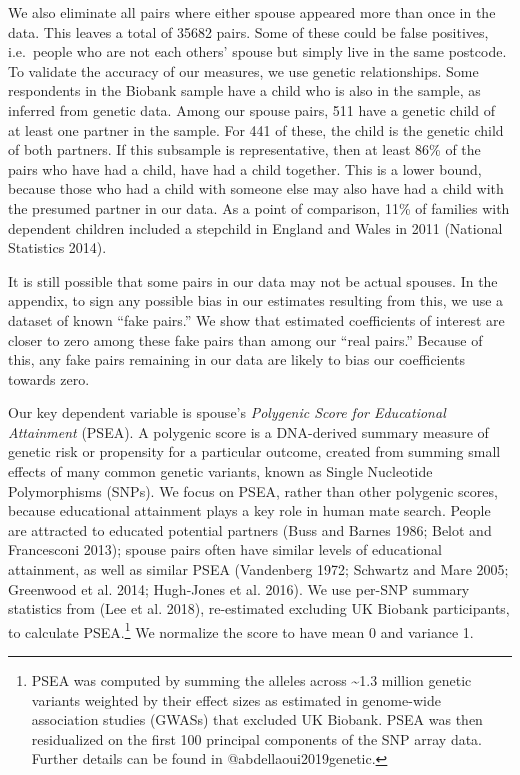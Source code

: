 \documentclass[
]{article}
\begin{document}
We also eliminate all pairs where either spouse appeared more than once
in the data. This leaves a total of 35682 pairs. Some of
these could be false positives, i.e.~people who are not each others'
spouse but simply live in the same postcode. To validate the accuracy of
our measures, we use genetic relationships. Some respondents in the
Biobank sample have a child who is also in the sample, as inferred from
genetic data. Among our spouse pairs, 511 have a genetic
child of at least one partner in the sample. For 441 of
these, the child is the genetic child of both partners. If this
subsample is representative, then at least
86\% of the pairs who have had a
child, have had a child together. This is a lower bound, because those
who had a child with someone else may also have had a child with the
presumed partner in our data. As a point of comparison, 11\% of families
with dependent children included a stepchild in England and Wales in
2011 (National Statistics 2014).

It is still possible that some pairs in our data may not be actual
spouses. In the appendix, to sign any possible bias in our estimates
resulting from this, we use a dataset of known ``fake pairs.'' We show
that estimated coefficients of interest are closer to zero among these
fake pairs than among our ``real pairs.'' Because of this, any fake pairs
remaining in our data are likely to bias our coefficients towards zero.

Our key dependent variable is spouse's \emph{Polygenic Score for Educational
Attainment} (PSEA). A polygenic score is a DNA-derived summary measure
of genetic risk or propensity for a particular outcome, created from
summing small effects of many common genetic variants, known as Single
Nucleotide Polymorphisms (SNPs). We focus on PSEA, rather than other
polygenic scores, because educational attainment plays a key role in
human mate search. People are attracted to educated potential partners
(Buss and Barnes 1986; Belot and Francesconi 2013); spouse pairs often have
similar levels of educational attainment, as well as similar PSEA
(Vandenberg 1972; Schwartz and Mare 2005; Greenwood et al. 2014; Hugh-Jones et al. 2016). We use per-SNP summary statistics from
(Lee et al. 2018), re-estimated excluding UK Biobank participants, to
calculate PSEA.\footnote{PSEA was computed by summing the alleles across \textasciitilde1.3 million
  genetic variants weighted by their effect sizes as estimated in
  genome-wide association studies (GWASs) that excluded UK Biobank.
  PSEA was then residualized on the first 100 principal components of
  the SNP array data. Further details can be found in
  @abdellaoui2019genetic.} We normalize the score to have mean 0 and variance
1.
\end{document}
